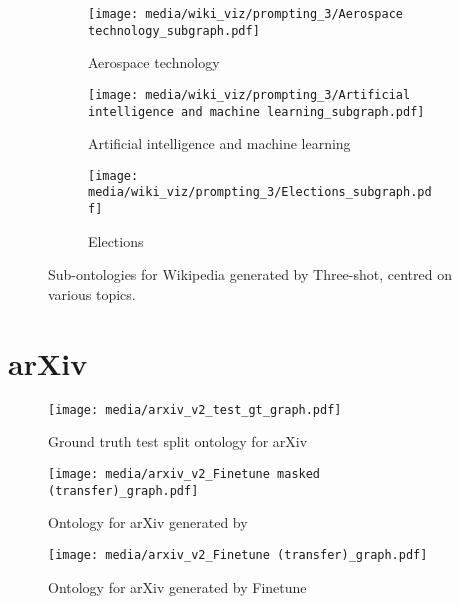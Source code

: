 \begin{figure}[H]
    \centering
    \begin{subfigure}{0.9\textwidth}
        \centering
        \texttt{[image: media/wiki\_viz/prompting\_3/Aerospace technology\_subgraph.pdf]}
        \caption{Aerospace technology}
    \end{subfigure}
    \begin{subfigure}{0.9\textwidth}
        \centering
        \texttt{[image: media/wiki\_viz/prompting\_3/Artificial intelligence and machine learning\_subgraph.pdf]}
        \caption{Artificial intelligence and machine learning}
    \end{subfigure}
    \begin{subfigure}{1.0\textwidth}
        \centering
        \texttt{[image: media/wiki\_viz/prompting\_3/Elections\_subgraph.pdf]}
        \caption{Elections}
        \label{fig:3shot-wiki-samples-election}
    \end{subfigure}
    \caption{Sub-ontologies for Wikipedia generated by Three-shot, centred on various topics.}
\end{figure}

\section{arXiv}  \label{appendix:viz-arxiv}

\begin{figure}[h]
    \centering
    \texttt{[image: media/arxiv\_v2\_test\_gt\_graph.pdf]}
    \caption{Ground truth test split ontology for arXiv}
\end{figure}


\begin{figure}[h]
    \centering
    \texttt{[image: media/arxiv\_v2\_Finetune masked (transfer)\_graph.pdf]}
    \caption{Ontology for arXiv generated by \name}
    \label{fig:ollm-arxiv}
\end{figure}


\begin{figure}[h]
    \centering
    \texttt{[image: media/arxiv\_v2\_Finetune (transfer)\_graph.pdf]}
    \caption{Ontology for arXiv generated by Finetune}
\end{figure}

